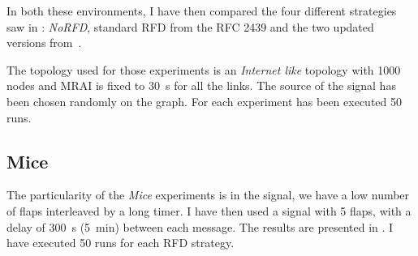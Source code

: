 In both these environments, I have then compared the four different strategies
saw in : \textit{NoRFD},
standard \ac{RFD} from the \ac{RFC} \num{2439} and the two updated versions
from~\cite{rfc7196}.

The topology used for those experiments is an \textit{Internet like} topology
with \num{1000} nodes and \ac{MRAI} is fixed to \SI{30}{\second} for all the links.
The source of the signal has been chosen randomly on the graph.
For each experiment has been executed \num{50} runs.


\subsection{Mice}
\label{subsec:rfd_mice}

The particularity of the \textit{Mice} experiments is in the signal, we have
a low number of flaps interleaved by a long timer.
I have then used a signal with \num{5} flaps,  with a delay
of \SI{300}{\second} (\SI{5}{\minute}) between each message.
The results are presented in .
I have executed \num{50} runs for each \ac{RFD} strategy.

